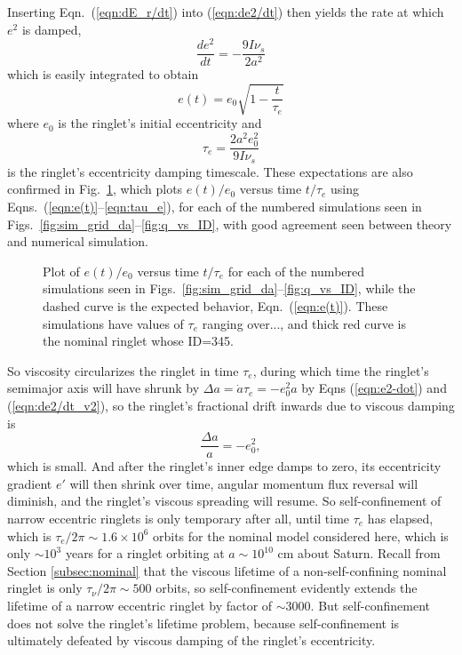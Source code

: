 \documentclass[preprint]{aastex62}
\begin{document}
Inserting Eqn.\ (\ref{eqn:dE_r/dt}) into (\ref{eqn:de2/dt}) then yields the rate at which $e^2$
is damped,
\begin{equation}
    \label{eqn:de2/dt_v2}
    \frac{de^2}{dt} = -\frac{9I\nu_s}{2a^2}
\end{equation}
which is easily integrated to obtain
\begin{equation}
    \label{eqn:e(t)}
    e(t) = e_0\sqrt{1-\frac{t}{\tau_e}}
\end{equation}
where $e_0$ is the ringlet's initial eccentricity and
\begin{equation}
    \label{eqn:tau_e}
    \tau_e = \frac{2a^2e_0^2}{9I\nu_s}
\end{equation}
is the ringlet's eccentricity damping timescale.
These expectations are also confirmed in Fig.\ \ref{fig:e_vs_tau_e}, which plots
$e(t)/e_0$ versus time $t/\tau_e$ using Eqns.\ (\ref{eqn:e(t)}--\ref{eqn:tau_e}),
for each of the numbered simulations seen in Figs.\ \ref{fig:sim_grid_da}--\ref{fig:q_vs_ID},
with good agreement seen between theory and numerical simulation.
\begin{figure}
    \caption{
        \label{fig:e_vs_tau_e}
        Plot of $e(t)/e_0$ versus time $t/\tau_e$ for each of the 
        numbered simulations seen in Figs.\ \ref{fig:sim_grid_da}--\ref{fig:q_vs_ID},
        while the dashed curve is the expected behavior, Eqn.\ (\ref{eqn:e(t)}).
        These simulations have values of $\tau_e$ ranging over...,
        and thick red curve is the nominal ringlet whose ID=345.
    }
\end{figure}

So viscosity circularizes the ringlet in time $\tau_e$, during which time the ringlet's
semimajor axis will have shrunk by $\Delta a=\dot{a}\tau_e=-e_0^2a$ by Eqns (\ref{eqn:e2-dot})
and (\ref{eqn:de2/dt_v2}), so the ringlet's
fractional drift inwards due to viscous damping is
\begin{equation}
    \label{eqn:delta-a}
    \frac{\Delta a}{a} = -e_0^2,
\end{equation}
which is small. And after the ringlet's inner edge damps to zero, its eccentricity gradient $e'$
will then shrink over time, angular momentum flux reversal will diminish, and the ringlet's 
viscous spreading will resume. So self-confinement of narrow eccentric ringlets is only temporary
after all, until time $\tau_e$ has elapsed, which is $\tau_e/2\pi\sim1.6\times10^6$ orbits for 
the nominal model considered here, which is only $\sim10^3$ years for a ringlet orbiting at 
$a\sim10^{10}$ cm about Saturn. Recall from Section \ref{subsec:nominal}
that the viscous lifetime of a non-self-confining
nominal ringlet is only $\tau_\nu/2\pi\sim500$ orbits, so self-confinement evidently
extends the lifetime of a narrow eccentric ringlet by factor of $\sim3000$. But self-confinement
does not solve the ringlet's lifetime problem, because self-confinement is ultimately
defeated by viscous damping of the ringlet's eccentricity.
\end{document}
